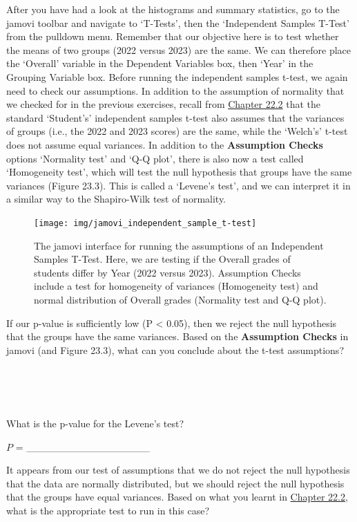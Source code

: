 \documentclass[
  openany]{krantz}
\begin{document}
After you have had a look at the histograms and summary statistics, go to the jamovi toolbar and navigate to `T-Tests', then the `Independent Samples T-Test' from the pulldown menu.
Remember that our objective here is to test whether the means of two groups (2022 versus 2023) are the same.
We can therefore place the `Overall' variable in the Dependent Variables box, then `Year' in the Grouping Variable box.
Before running the independent samples t-test, we again need to check our assumptions.
In addition to the assumption of normality that we checked for in the previous exercises, recall from \protect\hyperlink{independent-samples-t-test}{Chapter 22.2} that the standard `Student's' independent samples t-test also assumes that the variances of groups (i.e., the 2022 and 2023 scores) are the same, while the `Welch's' t-test does not assume equal variances.
In addition to the \textbf{Assumption Checks} options `Normality test' and `Q-Q plot', there is also now a test called `Homogeneity test', which will test the null hypothesis that groups have the same variances (Figure 23.3).
This is called a `Levene's test', and we can interpret it in a similar way to the Shapiro-Wilk test of normality.

\begin{figure}
\texttt{[image: img/jamovi\_independent\_sample\_t-test]} \caption{The jamovi interface for running the assumptions of an Independent Samples T-Test. Here, we are testing if the Overall grades of students differ by Year (2022 versus 2023). Assumption Checks include a test for homogeneity of variances (Homogeneity test) and normal distribution of Overall grades (Normality test and Q-Q plot).}\label{fig:unnamed-chunk-91}
\end{figure}

If our p-value is sufficiently low (P \textless{} 0.05), then we reject the null hypothesis that the groups have the same variances.
Based on the \textbf{Assumption Checks} in jamovi (and Figure 23.3), what can you conclude about the t-test assumptions?

\begin{verbatim}




\end{verbatim}

What is the p-value for the Levene's test?

\(P\) = \_\_\_\_\_\_\_\_\_\_\_\_\_\_\_\_\_

It appears from our test of assumptions that we do not reject the null hypothesis that the data are normally distributed, but we should reject the null hypothesis that the groups have equal variances.
Based on what you learnt in \protect\hyperlink{independent-samples-t-test}{Chapter 22.2}, what is the appropriate test to run in this case?
\end{document}
